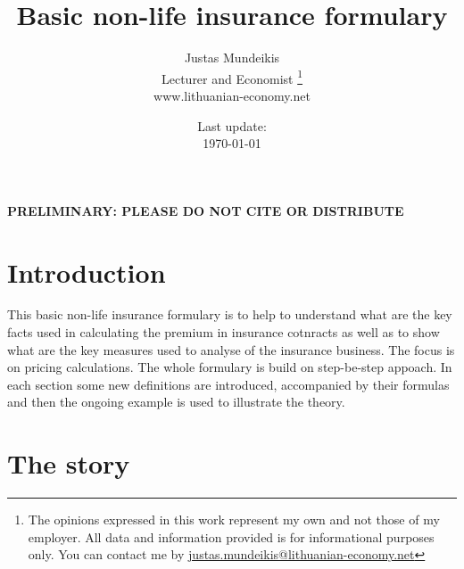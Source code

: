 \documentclass[11pt,a4paper,fleqn]{article}      %
\begin{document}
\begin{titlepage}
\title{Basic non-life insurance formulary}
\author{Justas Mundeikis\\ Lecturer and Economist \footnote{The opinions expressed in this work represent my own and not those of my employer. All data and information provided is for informational purposes only. You can contact me by \href{mailto: justas.mundeikis@lithuanian-economy.net}{justas.mundeikis@lithuanian-economy.net} }\\ www.lithuanian-economy.net}
\date{Last update:\\ \today}
\maketitle
\thispagestyle{empty}
\begin{center}{\bf \color{darkblue} PRELIMINARY: PLEASE DO NOT CITE OR DISTRIBUTE}\end{center}
\vspace{0.5cm}


\end{titlepage}
\clearpage

 
 
\tableofcontents
 
\newpage
\section{Introduction}
This basic non-life insurance formulary is to help to understand what are the key facts used in calculating the premium in insurance cotnracts as well as to show what are the key measures used to analyse of the insurance business. The focus is on pricing calculations. The whole formulary is build on step-be-step appoach. In each section some new definitions are introduced, accompanied by their formulas and then the ongoing example is used to illustrate the theory.

\section{The story}
\end{document}
